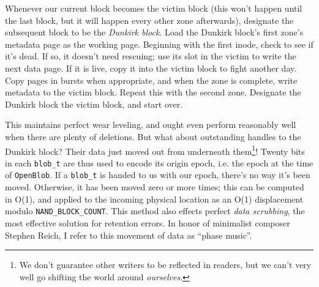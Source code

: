 \documentclass[letterpaper,10pt]{article}
\begin{document}
Whenever our current block becomes the victim block (this won't happen until the
last block, but it will happen every other zone afterwards), designate the subsequent
block to be the \textit{Dunkirk block}. Load the Dunkirk block's first zone's
metadata page as the working page. Beginning with the first inode, check to
see if it's dead. If so, it doesn't need rescuing; use its slot in the victim
to write the next data page. If it is live, copy it into the victim block to
fight another day. Copy pages in bursts when appropriate, and when the zone is
complete, write metadata to the victim block. Repeat this with the second zone.
Designate the Dunkirk block the victim block, and start over.

This maintains perfect wear leveling, and ought even perform reasonably well
when there are plenty of deletions. But what about outstanding handles to the
Dunkirk block? Their data just moved out from underneath them\footnote{We don't
guarantee other writers to be reflected in readers, but we can't very well
go shifting the world around \textit{ourselves}.}! Twenty bits in
each \texttt{blob\_t} are thus used to encode its origin epoch, i.e. the epoch
at the time of \texttt{OpenBlob}. If a \texttt{blob\_t} is handed to us with
our epoch, there's no way it's been moved. Otherwise, it has been moved zero or
more times; this can be computed in O(1), and applied to the incoming physical
location as an O(1) displacement modulo \texttt{NAND\_BLOCK\_COUNT}. This
method also effects perfect \textit{data scrubbing}\parencite{management},
the most effective solution for retention errors. In honor of minimalist
composer Stephen Reich, I refer to this movement of data as ``phase music''.
\end{document}

